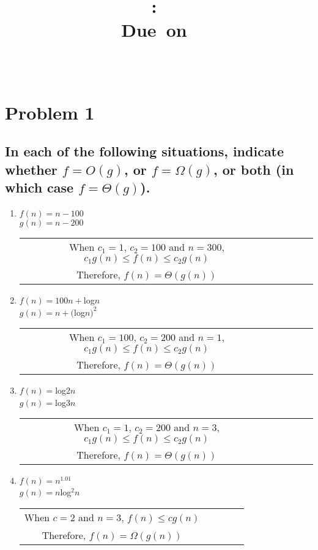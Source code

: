 \documentclass{article}
\title{
    \vspace{2in}
    \textmd{\textbf{\hmwkClass:\ \hmwkTitle}}\\
    \normalsize\vspace{0.1in}\small{Due\ on\ \hmwkDueDate}\\
    \vspace{0.1in}\large{\textit{\hmwkClassInstructor\ \hmwkClassTime}}
    \vspace{3in}
}
\author{\hmwkAuthorName}
\date{}
\begin{document}
\maketitle
\pagebreak

\section*{Problem 1}
\subsection*{In each of the following situations, indicate whether $f=O(g)$, or $f=\Omega(g)$, or both (in which case $f=\Theta(g)$).}
\begin{enumerate}[label=(\alph*)]
\item \addtocounter{enumi}{1}$f(n)=n-100$ 
\\$g(n)=n-200$
	\begin{center}
    	\begin{tabular} {c c c c c}
    		When $c_1=1$, $c_2=100$ and $n=300$, $c_1g(n)\leq f(n)\leq c_2g(n)$\\
            Therefore, $f(n)=\Theta(g(n))$\\
        \end{tabular}
    \end{center}
\item \addtocounter{enumi}{1} $f(n)=100n+$log$n$
\\ $g(n)=n+($log$n)^2$
	\begin{center}
    	\begin{tabular} {c c c c c}
        	When $c_1=100$, $c_2=200$ and $n=1$, $c_1g(n)\leq f(n)\leq c_2g(n)$\\
            Therefore, $f(n)=\Theta(g(n))$\\
        \end{tabular}
    \end{center}
\item \addtocounter{enumi}{1} $f(n)=$log$2n$
\\ $g(n)=$log$3n$
	\begin{center}
    	\begin{tabular} {c c c c c}
        	When $c_1=1$, $c_2=200$ and $n=3$, $c_1g(n)\leq f(n)\leq c_2g(n)$\\
            Therefore, $f(n)=\Theta(g(n))$\\
        \end{tabular}
    \end{center}
\item \addtocounter{enumi}{1} $f(n)=n^{1.01}$
\\ $g(n)=n$log$^2n$
	\begin{center}
    	\begin{tabular} {c c c c c}
        	When $c=2$ and $n=3$, $f(n)\leq cg(n)$\\
            Therefore, $f(n)=\Omega(g(n))$\\
        \end{tabular}
    \end{center}


\end{enumerate}
\end{document}
